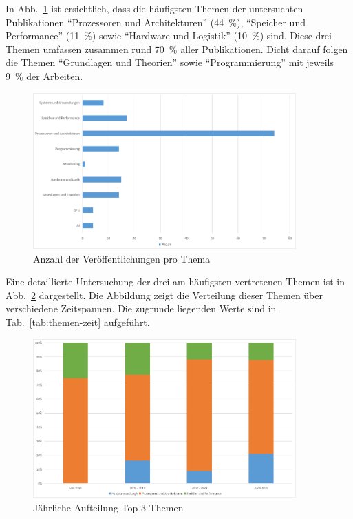 In Abb.~\ref{fig:3-anzahl-themen} ist ersichtlich, dass die häufigsten Themen der untersuchten Publikationen \enquote{Prozessoren und Architekturen} (44~\%), \enquote{Speicher und Performance} (11~\%) sowie \enquote{Hardware und Logistik} (10~\%) sind. Diese drei Themen umfassen zusammen rund 70~\% aller Publikationen. Dicht darauf folgen die Themen \enquote{Grundlagen und Theorien} sowie \enquote{Programmierung} mit jeweils 9~\% der Arbeiten.


\begin{figure}[htbp]
    \centering
    \includegraphics[width=0.90\textwidth]{graphics/3-anzahl-themen.png}
    \caption{Anzahl der Veröffentlichungen pro Thema}
    \label{fig:3-anzahl-themen}
\end{figure}

Eine detaillierte Untersuchung der drei am häufigsten vertretenen Themen ist in Abb.~\ref{fig:4-top3-themen} dargestellt. Die Abbildung zeigt die Verteilung dieser Themen über verschiedene Zeitspannen. Die zugrunde liegenden Werte sind in Tab.~\ref{tab:themen-zeit} aufgeführt.
 
\begin{figure}[htbp]
    \centering
    \includegraphics[width=0.90\textwidth]{graphics/4-top3-themen-jahr.png}
    \caption{Jährliche Aufteilung Top 3 Themen}
    \label{fig:4-top3-themen}
\end{figure}

